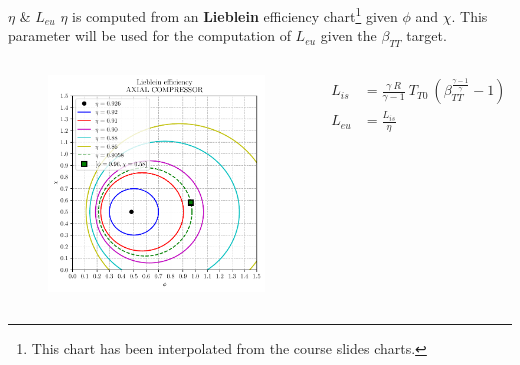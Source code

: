 	\begin{frame}{$\eta$ \& $L_{eu}$}
		$\eta$ is computed from an \textbf{Lieblein} efficiency chart\footnote{This chart has been interpolated from the course slides charts.} given $\phi$ and $\chi$. This parameter will be used for the computation of $L_{eu}$ given the $\beta_{TT}$ target.
		\begin{columns}
				\begin{figure}
					\centering 
					\includegraphics[width=1\textwidth]{figures/efficiency.pdf}
				\end{figure}
			\begin{align}
				L_{is} & = \frac{\gamma \ R}{\gamma - 1} \ T_{T0} \ (\beta_{TT}^{{\frac{\gamma - 1}{\gamma}}} - 1) \nonumber \\
				L_{eu} & = \frac{L_{is}}{\eta} \nonumber
			\end{align}
		\end{columns}
	\end{frame}

